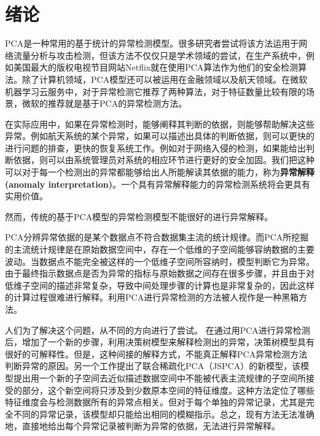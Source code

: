 \chapter{绪论}
\label{cha:intro}
PCA是一种常用的基于统计的异常检测模型。很多研究者尝试将该方法运用于网络流量分析与攻击检测\cite{Anomaly-Survey-09,XuWeiGoogle,Lakhina-2005-sigcomm,jiang2013family}，但该方法不仅仅只是学术领域的尝试，在生产系统中，例如美国最大的版权电视节目网站Netflix就在使用PCA算法作为他们的安全检测算法\cite{netflix-outlier}。除了计算机领域，PCA模型还可以被运用在金融领域\cite{jiang2013family}以及航天领域\cite{dutta2007distributed}。在微软机器学习云服务中，对于异常检测它推荐了两种算法，对于特征数量比较有限的场景，微软的推荐就是基于PCA的异常检测方法\cite{microsoft-cheatsheet}。

在实际应用中，如果在异常检测时，能够阐释其判断的依据，则能够帮助解决这些异常。例如航天系统的某个异常，如果可以描述出具体的判断依据，则可以更快的进行问题的排查，更快的恢复系统工作。例如对于网络入侵的检测，如果能给出判断依据，则可以由系统管理员对系统的相应环节进行更好的安全加固。我们把这种可以对于每一个检测出的异常都能够给出人所能解读其依据的能力，称为{\bf 异常解释(anomaly interpretation)}。一个具有异常解释能力的异常检测系统将会更具有实用价值。

然而，传统的基于PCA模型的异常检测模型不能很好的进行异常解释\cite{XuWei-SOSP,PCA-Sensitivity}。

PCA分辨异常依据的是某个数据点不符合数据集主流的统计规律。而PCA所挖掘的主流统计规律是在原始数据空间中，存在一个低维的子空间能够容纳数据的主要波动。当数据点不能完全被这样的一个低维子空间所容纳时，模型判断它为异常。由于最终指示数据点是否为异常的指标与原始数据之间存在很多步骤，并且由于对低维子空间的描述非常复杂，导致中间处理步骤的计算也是非常复杂的，因此这样的计算过程很难进行解释。利用PCA进行异常检测的方法被人视作是一种黑箱方法\cite{XuWei-SOSP}。

人们为了解决这个问题，从不同的方向进行了尝试。\cite{XuWei-SOSP} 在通过用PCA进行异常检测后，增加了一个新的步骤，利用决策树模型来解释检测出的异常，决策树模型具有很好的可解释性。但是，这种间接的解释方式，不能真正解释PCA异常检测方法判断异常的原因\cite{PCA-Sensitivity}。另一个工作\cite{jiang2013family}提出了联合稀疏化PCA（JSPCA）的新模型，该模型提出用一个新的子空间去近似描述数据空间中不能被代表主流规律的子空间所接受的部分，这个新空间将只涉及到少数原本空间的特征维度。这种方法定位了哪些特征维度会与检测数据所有的异常点相关。但对于每个单独的异常记录，尤其是完全不同的异常记录，该模型却只能给出相同的模糊指示。总之，现有方法无法准确地，直接地给出每个异常记录被判断为异常的依据，无法进行异常解释。

